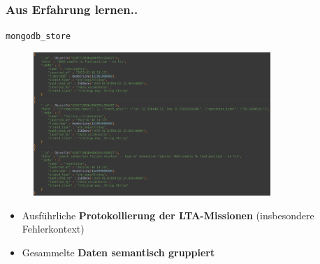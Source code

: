\documentclass{beamer}
\newcommand{\code}[1]{\colorbox{light-gray}{\texttt{#1}}}
\begin{document}
\begin{frame}
  \frametitle{Aus Erfahrung lernen..}
  \code{mongodb\_store}
  \begin{figure}[H]
    \centering
    \includegraphics[width=0.8\textwidth]{img/database_entries.png}
  \end{figure}
  \begin{itemize}
    \item Ausführliche \textbf{Protokollierung der LTA-Missionen} (insbesondere Fehlerkontext)
    \item Gesammelte \textbf{Daten semantisch gruppiert}
  \end{itemize}
\end{frame}






\begin{frame}[allowframebreaks]
  
  
\end{frame}
\end{document}
